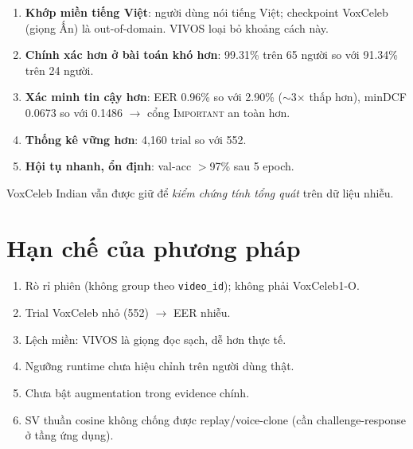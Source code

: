 \documentclass[12pt,a4paper]{article}
\begin{document}
\begin{enumerate}
  \item \textbf{Khớp miền tiếng Việt}: người dùng nói tiếng Việt; checkpoint
  VoxCeleb (giọng Ấn) là out-of-domain. VIVOS loại bỏ khoảng cách này.
  \item \textbf{Chính xác hơn ở bài toán khó hơn}: 99.31\% trên 65 người so với
  91.34\% trên 24 người.
  \item \textbf{Xác minh tin cậy hơn}: EER 0.96\% so với 2.90\% ($\sim$3$\times$
  thấp hơn), minDCF 0.0673 so với 0.1486 $\to$ cổng \textsc{Important} an toàn hơn.
  \item \textbf{Thống kê vững hơn}: 4{,}160 trial so với 552.
  \item \textbf{Hội tụ nhanh, ổn định}: val-acc $>$97\% sau 5 epoch.
\end{enumerate}
VoxCeleb Indian vẫn được giữ để \emph{kiểm chứng tính tổng quát} trên dữ liệu nhiễu.

\section{Hạn chế của phương pháp}
\begin{enumerate}
  \item Rò rỉ phiên (không group theo \texttt{video\_id}); không phải VoxCeleb1-O.
  \item Trial VoxCeleb nhỏ (552) $\to$ EER nhiễu.
  \item Lệch miền: VIVOS là giọng đọc sạch, dễ hơn thực tế.
  \item Ngưỡng runtime chưa hiệu chỉnh trên người dùng thật.
  \item Chưa bật augmentation trong evidence chính.
  \item SV thuần cosine không chống được replay/voice-clone (cần challenge-response
  ở tầng ứng dụng).
\end{enumerate}

\end{document}
